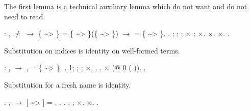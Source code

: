 \documentclass[12pt]{report}
\begin{document}
 The first lemma is a technical auxiliary lemma which do not 
    want and do not need to read. 
\begin{coqdoccode}
\coqdocemptyline
\coqdocnoindent
{}  :\coqdockw{\ensuremath{\forall}}     ,  \ensuremath{\not=}  \ensuremath{\rightarrow}\coqdoceol
\coqdocindent{1.00em}
\{ \~{}> \} = \{ \~{}> \}(\{ \~{}> \}) \ensuremath{\rightarrow}  = \{ \~{}> \}.\coqdoceol
\coqdocnoindent
{}.\coqdoceol
\coqdocindent{1.00em}
 ;   ; ; \ensuremath{\times} ; \ensuremath{\times}.\coqdoceol
\coqdocindent{1.00em}
\ensuremath{\times}. \ensuremath{\times}.\coqdoceol
\coqdocnoindent
{}.\coqdoceol
\coqdocemptyline
\end{coqdoccode}
Substitution on indices is identity on well-formed terms. 
\begin{coqdoccode}
\coqdocemptyline
\coqdocnoindent
{}  : \coqdockw{\ensuremath{\forall}}  ,\coqdoceol
\coqdocindent{1.00em}
  \ensuremath{\rightarrow} \coqdockw{\ensuremath{\forall}} ,  = \{ \~{}> \}.\coqdoceol
\coqdocnoindent
{}.\coqdoceol
\coqdocindent{1.00em}
 1; ; ; \ensuremath{\times}.  .\coqdoceol
\coqdocindent{1.00em}
 . \ensuremath{\times} (@  0 ( )).\coqdoceol
\coqdocnoindent
{}.\coqdoceol
\coqdocemptyline
\end{coqdoccode}
Substitution for a fresh name is identity. 
\begin{coqdoccode}
\coqdocemptyline
\coqdocnoindent
{}  : \coqdockw{\ensuremath{\forall}}   , \coqdoceol
\coqdocindent{1.00em}
    \ensuremath{\rightarrow}  [ \~{}> ]  = .\coqdoceol
\coqdocnoindent
{}. .  ; ; \ensuremath{\times}. \ensuremath{\times}. .\coqdoceol
\coqdocemptyline
\end{coqdoccode}
\end{document}
